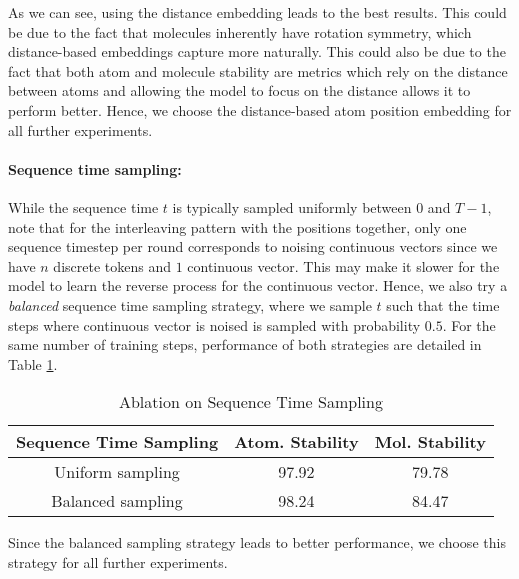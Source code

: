 As we can see, using the distance embedding leads to the best results. This could be due to the fact that molecules inherently have rotation symmetry, which distance-based embeddings capture more naturally. This could also be due to the fact that both atom and molecule stability are metrics which rely on the distance between atoms and allowing the model to focus on the distance allows it to perform better. Hence, we choose the distance-based atom position embedding for all further experiments.

\paragraph{Sequence time sampling:}

While the sequence time $t$ is typically sampled uniformly between $0$ and $T-1$, note that for the interleaving pattern with the positions together, only one sequence timestep per round corresponds to noising continuous vectors since we have $n$ discrete tokens and $1$ continuous vector. This may make it slower for the model to learn the reverse process for the continuous vector. Hence, we also try a \textit{balanced} sequence time sampling strategy, where we sample $t$ such that the time steps where continuous vector is noised is sampled with probability $0.5$. For the same number of training steps, performance of both strategies are detailed in Table \ref{tab:abl_qm9_seq_time}.
\begin{table}[h]
    \centering
    \begin{tabular}{c c c}
    \toprule
  Sequence Time Sampling & Atom. Stability & Mol. Stability \\
  \midrule
  Uniform sampling  &  97.92 & 79.78 \\
  Balanced sampling  & 98.24 & 84.47 \\
  \bottomrule
\end{tabular}
    \caption{Ablation on Sequence Time Sampling}
    \label{tab:abl_qm9_seq_time}
\end{table}

Since the balanced sampling strategy leads to better performance, we choose this strategy for all further experiments.

